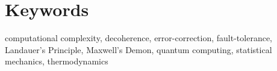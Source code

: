 \section*{Keywords}

computational complexity, decoherence,
error-correction, fault-tolerance, Landauer's
Principle, Maxwell's Demon, quantum computing,
statistical mechanics, thermodynamics
